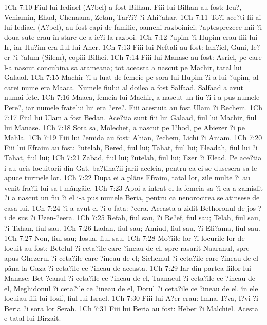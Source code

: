 1Ch 7:10  Fiul lui Iediael (A?bel) a fost Bilhan. Fiii lui Bilhan au fost: Ieu?, Veniamin, Ehud, Chenaana, Zetan, Tar?i? ?i Ahi?ahar.
1Ch 7:11  To?i ace?ti fii ai lui Iediael (A?bel), au fost capi de familie, oameni razboinici; ?aptesprezece mii ?i doua sute erau în stare de a ie?i la razboi.
1Ch 7:12  ?upim ?i Hupim erau fiii lui Ir, iar Hu?im era fiul lui Aher.
1Ch 7:13  Fiii lui Neftali au fost: Iah?iel, Guni, Ie?er ?i ?alum (Silem), copiii Bilhei.
1Ch 7:14  Fiii lui Manase au fost: Asriel, pe care l-a nascut concubina sa arameana; tot aceasta a nascut pe Machir, tatal lui Galaad.
1Ch 7:15  Machir ?i-a luat de femeie pe sora lui Hupim ?i a lui ?upim, al carei nume era Maaca. Numele fiului al doilea a fost Salfaad. Salfaad a avut numai fete.
1Ch 7:16  Maaca, femeia lui Machir, a nascut un fiu ?i i-a pus numele Pere?, iar numele fratelui lui era ?ere?. Fiii acestuia au fost Ulam ?i Rechem.
1Ch 7:17  Fiul lui Ulam a fost Bedan. Ace?tia sunt fiii lui Galaad, fiul lui Machir, fiul lui Manase.
1Ch 7:18  Sora sa, Molechet, a nascut pe I?hod, pe Abiezer ?i pe Mahla.
1Ch 7:19  Fiii lui ?emida au fost: Ahian, ?echem, Lichi ?i Aniam.
1Ch 7:20  Fiii lui Efraim au fost: ?utelah, Bered, fiul lui; Tahat, fiul lui; Eleadah, fiul lui ?i Tahat, fiul lui;
1Ch 7:21  Zabad, fiul lui; ?utelah, fiul lui; Ezer ?i Elead. Pe ace?tia i-au ucis locuitorii din Gat, ba?tina?ii jarii aceleia, pentru ca ei se dusesera sa le apuce turmele lor.
1Ch 7:22  Dupa ei a plâns Efraim, tatal lor, zile multe ?i au venit fra?ii lui sa-l mângâie.
1Ch 7:23  Apoi a intrat el la femeia sa ?i ea a zamislit ?i a nascut un fiu ?i el i-a pus numele Beria, pentru ca nenorocirea se atinsese de casa lui.
1Ch 7:24  ?i a avut el ?i o fata: ?eera. Aceasta a zidit Bethoronul de jos ?i de sus ?i Uzen-?eera.
1Ch 7:25  Refah, fiul sau, ?i Re?ef, fiul sau; Telah, fiul sau, ?i Tahan, fiul sau.
1Ch 7:26  Ladan, fiul sau; Amiud, fiul sau, ?i Eli?ama, fiul sau.
1Ch 7:27  Non, fiul sau; Iosua, fiul sau.
1Ch 7:28  Mo?iile lor ?i locurile lor de locuit au fost: Betelul ?i ceta?ile care ?ineau de el, spre rasarit Naaranul, spre apus Ghezerul ?i ceta?ile care ?ineau de el; Sichemul ?i ceta?ile care ?ineau de el pâna la Gaza ?i ceta?ile ce ?ineau de aceasta.
1Ch 7:29  Iar din partea fiilor lui Manase: Bet-?eanul ?i ceta?ile ce ?ineau de el, Taanacul ?i ceta?ile ce ?ineau de el, Meghidonul ?i ceta?ile ce ?ineau de el, Dorul ?i ceta?ile ce ?ineau de el. în ele locuiau fiii lui Iosif, fiul lui Israel.
1Ch 7:30  Fiii lui A?er erau: Imna, I?va, I?vi ?i Beria ?i sora lor Serah.
1Ch 7:31  Fiii lui Beria au fost: Heber ?i Malchiel. Acesta e tatal lui Birzait.
